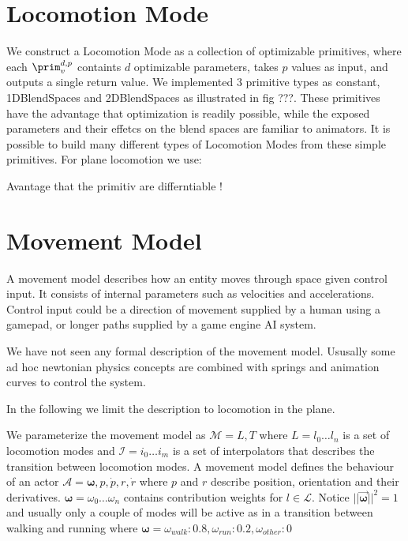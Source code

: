 \section{Locomotion Mode}
We construct a Locomotion Mode as a collection of optimizable primitives, where each $\prim^{d,p}_v$ containts $d$ optimizable parameters, takes $p$ values as input, and outputs a single return value. We implemented 3 primitive types as constant, 1DBlendSpaces and 2DBlendSpaces as illustrated in fig ???. These primitives have the advantage that optimization is readily possible, while the exposed parameters and their effetcs on the blend spaces are familiar to animators.
It is possible to build many different types of Locomotion Modes from these simple primitives. For plane locomotion we use:

Avantage that the primitiv are differntiable !


\section{Movement Model}

A movement model describes how an entity moves through space given control input. It consists of internal parameters such as velocities and accelerations. Control input could be a direction of movement supplied by a human using a gamepad, or longer paths supplied by a game engine AI system.

We have not seen any formal description of the movement model. Ususally some ad hoc newtonian physics concepts are combined with springs and animation curves to control the system.

In the following we limit the description to locomotion in the plane. 

We parameterize the movement model as $\mathcal{M}=L,T$ where $L=l_0 \ldots l_n$ is a set of locomotion modes and $\mathcal{I}=i_0 \ldots i_m$ is a set of interpolators that describes the transition between locomotion modes. A movement model defines the behaviour of an actor $\mathcal{A}=\boldsymbol{\omega},p,\dot{p},r,\dot{r}$ where $p$ and $r$ describe position, orientation and their derivatives.  $\boldsymbol{\omega}=\omega_0 \ldots \omega_n$ contains contribution weights for $l \in \mathcal{L}$. Notice $||\vec{\boldsymbol{\omega}}||^2=1$ and usually only a couple of modes will be active as in a transition between walking and running where $\boldsymbol{\omega}=\omega_{walk}:0.8, \omega_{run}:{0.2}, \omega_{other}:0$

